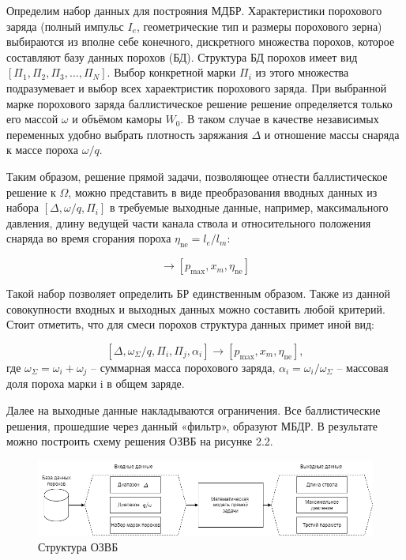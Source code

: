\documentclass[14pt, a4paper]{extreport} %
\begin{document}
Определим набор данных для построяния МДБР. Характеристики порохового заряда (полный импульс $I_e$, геометрические тип и размеры порохового зерна) выбираются из вполне себе конечного, дискретного множества порохов, которое составляют базу данных порохов (БД). Структура БД порохов имеет вид $[\Pi_1, \Pi_2, \Pi_3,...,\Pi_N]$. Выбор конкретной марки $\Pi_i$ из этого множества подразумевает и выбор всех хараектристик порохового заряда. При выбранной марке порохового заряда баллистическое решение решение определяется только его массой $\omega$ и объёмом каморы $W_0$.
В таком случае в качестве независимых переменных удобно выбрать плотность заряжания $\varDelta$ и отношение массы снаряда к массе пороха $ \omega / q$.

Таким образом, решение прямой задачи, позволяющее отнести баллистическое решение к $\Omega $, можно представить в виде преобразования вводных данных из набора $[\varDelta,  \omega / q,  \Pi_i ]$
в требуемые выходные данные, например, максимального давления, длину ведущей части канала ствола и относительного положения снаряда во время сгорания пороха $\eta_{\text{ne}} = l_e / l_m$:

\begin{equation}
    [\varDelta, \omega / q,  \Pi_i] \longrightarrow [p_{\text{max}}, x_m, \eta_{\text{ne}}]
\end{equation}

Такой набор позволяет определить БР единственным образом. Также из данной совокупности входных и выходных данных можно составить любой критерий. Стоит отметить, что для смеси порохов структура данных примет иной вид:

\[
 [\varDelta, \omega_\Sigma / q,  \Pi_i, \Pi_j, \alpha_i] \longrightarrow [p_{\text{max}}, x_m, \eta_{\text{ne}}], 
\]
где $\omega_\Sigma = \omega_i + \omega_j$ -- суммарная масса порохового заряда, $\alpha_i = \omega_i / \omega_\Sigma $ -- массовая доля пороха марки i в общем заряде.

Далее на выходные данные накладываются ограничения. Все баллистические решения, прошедшие через данный «фильтр», образуют МБДР. В результате можно построить схему решения ОЗВБ на рисунке 2.2. 


\begin{figure}[h]
\centering
\includegraphics[width=0.65\textheight]{imgs/OZVB_STRUCT.png}
\caption{Структура ОЗВБ}
\end{figure}
\end{document}

